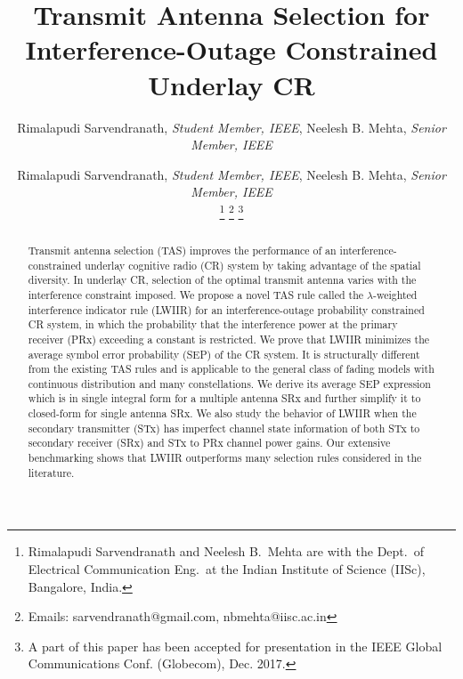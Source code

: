 \documentclass[12pt,draftcls,peerreview,onecolumn]{IEEEtran}
\newcommand{\lam}{\lambda}
\begin{document}
\title{Transmit Antenna Selection for Interference-Outage Constrained Underlay CR}

\author{Rimalapudi Sarvendranath, {\it Student Member, IEEE}, Neelesh B. Mehta, {\it Senior Member, IEEE}}

\author{
	Rimalapudi Sarvendranath, {\it Student Member, IEEE}, Neelesh B. Mehta, {\it Senior Member, IEEE}
	
	\thanks{Rimalapudi Sarvendranath and Neelesh B.\ Mehta are with the
		Dept.\ of Electrical Communication Eng.\ at the Indian Institute of
		Science (IISc), Bangalore, India.}  \thanks{Emails:
		sarvendranath@gmail.com, nbmehta@iisc.ac.in}
		\thanks{A part of this paper has been accepted for presentation in the IEEE Global
		Communications Conf. (Globecom), Dec. 2017.}
}

\setcounter{page}{1}

\maketitle

\begin{abstract}

Transmit antenna selection (TAS) improves the performance of an interference-constrained underlay cognitive radio (CR) system by taking advantage of the spatial diversity. In underlay CR, selection of the optimal transmit antenna varies with the interference constraint imposed. We propose a novel TAS rule called the $\lam$-weighted interference indicator rule (LWIIR) for an interference-outage probability constrained CR system, in which the probability that the interference power at the primary receiver (PRx) exceeding a constant is restricted. We prove that LWIIR minimizes the average symbol error probability (SEP) of the CR system. It is structurally different from the existing TAS rules and is applicable to the general class of fading models with continuous distribution and many constellations. We derive its average SEP expression which is in single integral form for a multiple antenna SRx and further simplify it to closed-form for single antenna SRx. We also study the behavior of LWIIR when the secondary transmitter (STx) has imperfect channel state information of both STx to secondary receiver (SRx) and STx to PRx channel power gains. Our extensive benchmarking shows that LWIIR outperforms many selection rules considered in the literature. 

\end{abstract}
\end{document}
